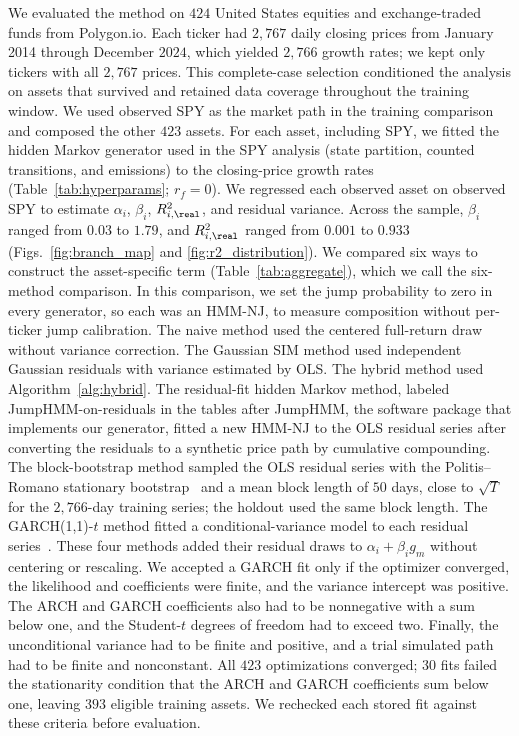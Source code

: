 We evaluated the method on $424$ United States equities and exchange-traded funds
from Polygon.io. Each ticker had $2{,}767$ daily closing prices from
January 2014 through December $2024$, which yielded $2{,}766$ growth rates; we kept only tickers with all
$2{,}767$ prices. This complete-case selection conditioned the analysis on assets
that survived and retained data coverage throughout the training
window. We used observed SPY as the market path in the training
comparison and composed the other $423$ assets. For each asset, including SPY, we fitted the hidden Markov generator used in the SPY analysis
(state partition, counted transitions, and emissions) to the
closing-price growth rates
(Table~\ref{tab:hyperparams}; $r_f=0$). We regressed each observed
asset on observed SPY to estimate $\alpha_i$, $\beta_i$,
$R^2_{i,\real}$, and residual variance. Across the sample, $\beta_i$
ranged from $0.03$ to $1.79$, and $R^2_{i,\real}$ ranged from $0.001$
to $0.933$ (Figs.~\ref{fig:branch_map} and \ref{fig:r2_distribution}).
We compared six ways to construct the asset-specific term
(Table~\ref{tab:aggregate}), which we call the six-method comparison.
In this comparison, we set the jump probability to zero in every
generator, so each was an HMM-NJ, to measure composition without
per-ticker jump calibration. The naive method used the centered
full-return draw without variance correction. The Gaussian SIM method
used independent Gaussian residuals with variance estimated by OLS.
The hybrid method used Algorithm~\ref{alg:hybrid}. The residual-fit
hidden Markov method, labeled JumpHMM-on-residuals in the tables after JumpHMM, the
software package that implements our generator, fitted a new HMM-NJ to the OLS residual series after converting the
residuals to a synthetic price path by cumulative compounding. The
block-bootstrap method sampled the OLS residual series with the
Politis--Romano stationary bootstrap~\cite{politisRomano1994} and a
mean block length of $50$ days, close to $\sqrt{T}$ for the
$2{,}766$-day training series; the holdout used the same block
length. The GARCH(1,1)-$t$ method
fitted a conditional-variance model to each residual
series~\cite{bollerslev1986}. These four methods added their residual
draws to $\alpha_i+\beta_i g_m$ without centering or rescaling. We accepted a GARCH fit only if the
optimizer converged, the likelihood and coefficients were finite, and
the variance intercept was positive. The ARCH and GARCH coefficients
also had to be nonnegative with a sum below one, and the Student-$t$
degrees of freedom had to exceed two. Finally, the unconditional
variance had to be finite and positive, and a trial simulated path had
to be finite and nonconstant. All $423$ optimizations converged; $30$ fits failed the stationarity
condition that the ARCH and GARCH coefficients sum below one, leaving
$393$ eligible training assets. We rechecked each stored fit against
these criteria before evaluation.

